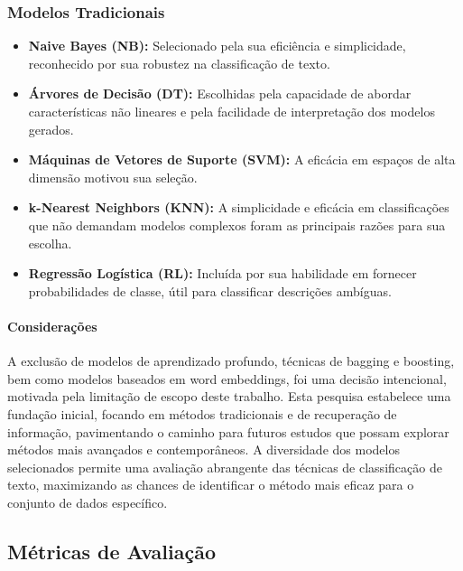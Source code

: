 \subsubsection{Modelos Tradicionais}
\begin{itemize}
    \item \textbf{Naive Bayes (NB):} Selecionado pela sua eficiência e simplicidade, reconhecido por sua robustez na classificação de texto.
    
    \item \textbf{Árvores de Decisão (DT):} Escolhidas pela capacidade de abordar características não lineares e pela facilidade de interpretação dos modelos gerados.
    
    \item \textbf{Máquinas de Vetores de Suporte (SVM):} A eficácia em espaços de alta dimensão motivou sua seleção.
    
    \item \textbf{k-Nearest Neighbors (KNN):} A simplicidade e eficácia em classificações que não demandam modelos complexos foram as principais razões para sua escolha.
    
    \item \textbf{Regressão Logística (RL):} Incluída por sua habilidade em fornecer probabilidades de classe, útil para classificar descrições ambíguas.
\end{itemize}

\paragraph{Considerações}
A exclusão de modelos de aprendizado profundo, técnicas de bagging e boosting, bem como modelos baseados em word embeddings, foi uma decisão intencional, motivada pela limitação de escopo deste trabalho. Esta pesquisa estabelece uma fundação inicial, focando em métodos tradicionais e de recuperação de informação, pavimentando o caminho para futuros estudos que possam explorar métodos mais avançados e contemporâneos. A diversidade dos modelos selecionados permite uma avaliação abrangente das técnicas de classificação de texto, maximizando as chances de identificar o método mais eficaz para o conjunto de dados específico.

\subsection{Métricas de Avaliação}

